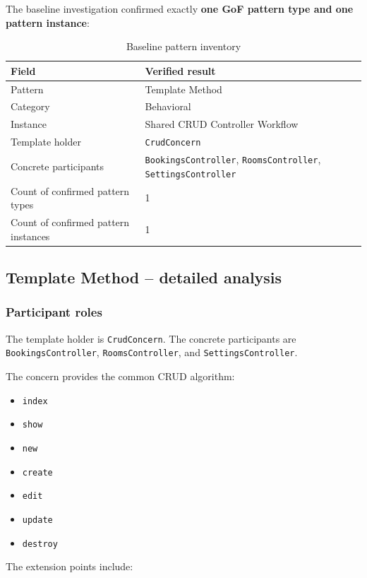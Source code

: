 \documentclass[10pt,a4paper]{article}
\newcommand{\code}[1]{\texttt{\small #1}}
\begin{document}
The baseline investigation confirmed exactly \textbf{one GoF pattern type and one pattern instance}:

\begin{table}[H]
\centering
\caption{Baseline pattern inventory}
\label{tab:baseline-pattern}
\begin{tabularx}{\linewidth}{lX}
\toprule
Field & Verified result\\
\midrule
Pattern & Template Method\\
Category & Behavioral\\
Instance & Shared CRUD Controller Workflow\\
Template holder & \code{CrudConcern}\\
Concrete participants & \code{BookingsController}, \code{RoomsController}, \code{SettingsController}\\
Count of confirmed pattern types & 1\\
Count of confirmed pattern instances & 1\\
\bottomrule
\end{tabularx}
\end{table}

\subsection{Template Method -- detailed analysis}

\subsubsection{Participant roles}

The template holder is \code{CrudConcern}. The concrete participants are \code{BookingsController}, \code{RoomsController}, and \code{SettingsController}.

The concern provides the common CRUD algorithm:

\begin{itemize}[leftmargin=*]
\item \code{index}
\item \code{show}
\item \code{new}
\item \code{create}
\item \code{edit}
\item \code{update}
\item \code{destroy}
\end{itemize}

The extension points include:
\end{document}
